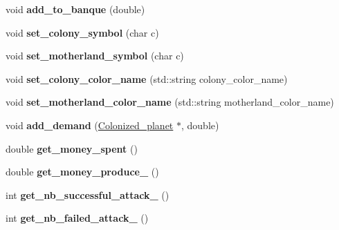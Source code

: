 \begin{DoxyCompactItemize}
\item 
\hypertarget{classFaction_ab550ddb4adcb6d480e4004915e7f20ce}{void {\bfseries add\-\_\-to\-\_\-banque} (double)}\label{classFaction_ab550ddb4adcb6d480e4004915e7f20ce}

\item 
\hypertarget{classFaction_a07b25ba27c0c8d158cb2310d064cc8a4}{void {\bfseries set\-\_\-colony\-\_\-symbol} (char c)}\label{classFaction_a07b25ba27c0c8d158cb2310d064cc8a4}

\item 
\hypertarget{classFaction_a9c1d1b8ab782174bf113ad7183cfe0c3}{void {\bfseries set\-\_\-motherland\-\_\-symbol} (char c)}\label{classFaction_a9c1d1b8ab782174bf113ad7183cfe0c3}

\item 
\hypertarget{classFaction_a51eadaa457179270f1950ed84e44df56}{void {\bfseries set\-\_\-colony\-\_\-color\-\_\-name} (std\-::string colony\-\_\-color\-\_\-name)}\label{classFaction_a51eadaa457179270f1950ed84e44df56}

\item 
\hypertarget{classFaction_ab17a2eabec14355868177554502972c7}{void {\bfseries set\-\_\-motherland\-\_\-color\-\_\-name} (std\-::string motherland\-\_\-color\-\_\-name)}\label{classFaction_ab17a2eabec14355868177554502972c7}

\item 
\hypertarget{classFaction_a8a61c34f87a1d1f1284aba39c4887595}{void {\bfseries add\-\_\-demand} (\hyperlink{classColonized__planet}{Colonized\-\_\-planet} $\ast$, double)}\label{classFaction_a8a61c34f87a1d1f1284aba39c4887595}

\item 
\hypertarget{classFaction_ac9c04d847c334eb3b5dc8a8dbe61586d}{double {\bfseries get\-\_\-money\-\_\-spent} ()}\label{classFaction_ac9c04d847c334eb3b5dc8a8dbe61586d}

\item 
\hypertarget{classFaction_ada676ea8a06f80c2710adf1243d48db2}{double {\bfseries get\-\_\-money\-\_\-produce\-\_\-} ()}\label{classFaction_ada676ea8a06f80c2710adf1243d48db2}

\item 
\hypertarget{classFaction_a7b174edbce20f49b7331665cb589e2f3}{int {\bfseries get\-\_\-nb\-\_\-successful\-\_\-attack\-\_\-} ()}\label{classFaction_a7b174edbce20f49b7331665cb589e2f3}

\item 
\hypertarget{classFaction_a70bbfa3dc7d4bf441d98984814f9abd1}{int {\bfseries get\-\_\-nb\-\_\-failed\-\_\-attack\-\_\-} ()}\label{classFaction_a70bbfa3dc7d4bf441d98984814f9abd1}


\end{DoxyCompactItemize}

